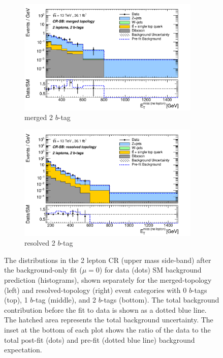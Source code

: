 \begin{figure}[htbp]
\begin{subfigure}{0.45\textwidth}
    \centering
    \includegraphics[width=0.95\textwidth]{figures/monoV/postfit/monoV_2lep_2tag_merged_massFail_met_XS.pdf}
    \caption{merged 2 \(b\)-tag}
  \end{subfigure}
    \begin{subfigure}{0.45\textwidth}
    \centering
    \includegraphics[width=0.95\textwidth]{figures/monoV/postfit/monoV_2lep_2tag_resolved_massFail_met_XS.pdf}
    \caption{resolved 2 \(b\)-tag}
  \end{subfigure}
  \caption{The \metnolep distributions in the 2 lepton CR (upper mass side-band) after the background-only fit (\(\mu=0\)) for data (dots) SM background prediction (histograms), shown separately for the merged-topology (left) and resolved-topology (right) event categories with 0 \(b\)-tags (top), 1 \(b\)-tag (middle), and 2 \(b\)-tags (bottom). The total background contribution before the fit to data is shown as a dotted blue line. The hatched area represents the total background uncertainty. The inset at the bottom of each plot shows the ratio of the data to the total post-fit (dots) and pre-fit (dotted blue line) background expectation.}
  \label{fig:appendix:monoV:postfit:cr2}
\end{figure}



